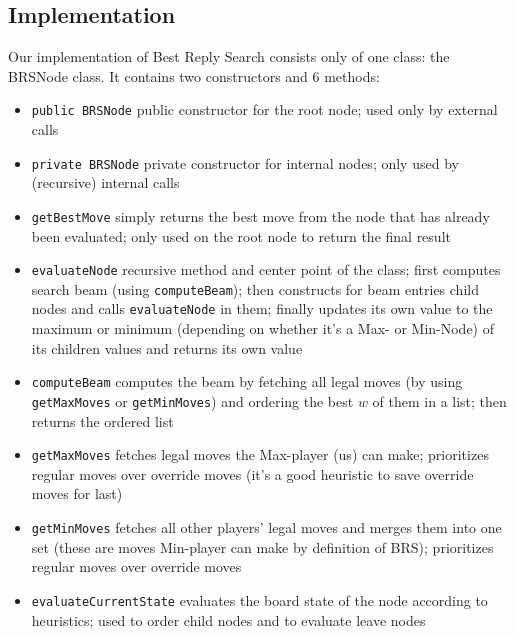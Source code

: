 \documentclass[a4paper,12pt]{article}
\begin{document}
\subsection{Implementation}
Our implementation of Best Reply Search consists only of one class: the BRSNode class. It contains two constructors and 6 methods:
\begin{itemize}
    \item \texttt{public BRSNode} \quad public constructor for the root node; used only by external calls
    \item \texttt{private BRSNode} \quad private constructor for internal nodes; only used by (recursive) internal calls
    \item \texttt{getBestMove} \quad simply returns the best move from the node that has already been evaluated; only used on the root node to return the final result
    \item \texttt{evaluateNode} \quad recursive method and center point of the class; first computes search beam (using \texttt{computeBeam}); then constructs for beam entries child nodes and calls \texttt{evaluateNode} in them; finally updates its own value to the maximum or minimum (depending on whether it's a Max- or Min-Node) of its children values and returns its own value
    \item \texttt{computeBeam} \quad computes the beam by fetching all legal moves (by using \texttt{getMaxMoves} or \texttt{getMinMoves}) and ordering the best $w$ of them in a list; then returns the ordered list
    \item \texttt{getMaxMoves} \quad fetches legal moves the Max-player (us) can make; prioritizes regular moves over override moves (it's a good heuristic to save override moves for last)
    \item \texttt{getMinMoves} \quad fetches all other players' legal moves and merges them into one set (these are moves Min-player can make by definition of BRS); prioritizes regular moves over override moves
    \item \texttt{evaluateCurrentState} \quad evaluates the board state of the node according to heuristics; used to order child nodes and to evaluate leave nodes
\end{itemize}
\end{document}
